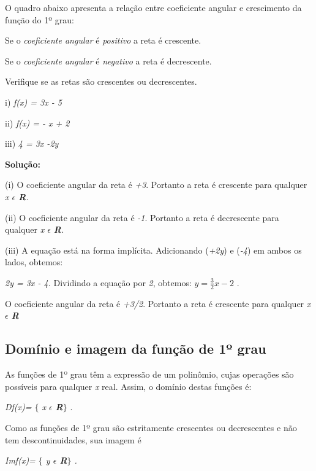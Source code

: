  O quadro abaixo apresenta a relação entre coeficiente angular e crescimento da função do 1º grau:

\begin{caixa}
Se o \textit{coeficiente angular} é \textit{positivo} a reta é crescente.

Se o \textit{coeficiente angular} é \textit{negativo }a reta é decrescente.
\end{caixa}

\begin{texemplo}
Verifique se as retas são crescentes ou decrescentes. 

i) \textit{f(x) = 3x - 5}

ii) \textit{f(x) = - x + 2}

iii) \textit{4 = 3x -2y}

\textbf{Solução:}

(i) O coeficiente angular da reta é \textit{+3}. Portanto a reta é crescente para qualquer \textit{x $ \epsilon $   \textbf{R}.}

(ii)  O coeficiente angular da reta é \textit{-1}. Portanto a reta é decrescente para qualquer \textit{x $ \epsilon $   \textbf{R}.}

(iii) A equação está na forma implícita. Adicionando (\textit{+2y}) e (\textit{-4}) em ambos os lados, obtemos:

\textit{\tab 2y = 3x - 4. }Dividindo a equação por \textit{2}, obtemos:   \( y=\frac{3}{2}x-2 \) . 

O coeficiente angular da reta é \textit{+3/2}. Portanto a reta é crescente para qualquer \textit{x $ \epsilon $   \textbf{R}  }\qedsymbol{}
\end{texemplo}

\subsection{Domínio e imagem da função de 1º grau}

\begin{caixa}
As funções de 1º grau têm a expressão de um polinômio, cujas operações são possíveis para qualquer \textit{x} real. Assim, o domínio destas funções é:

\textit{Df(x)= $ \{ $ x $ \epsilon $   \textbf{R}$ \} $ } .

Como as funções de 1º grau são estritamente crescentes ou decrescentes e não tem descontinuidades, sua imagem é

\textit{Imf(x)= $ \{ $ y $ \epsilon $   \textbf{R}$ \} $ .}
\end{caixa}

